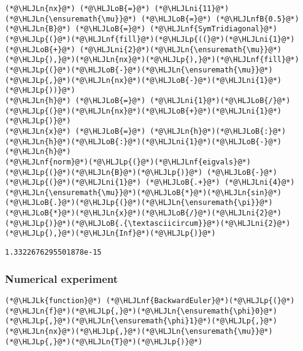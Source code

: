 \documentclass[12pt,landscape]{article}
\newcommand{\HLJLk}[1]{\textcolor[RGB]{148,91,176}{\textbf{#1}}}
\newcommand{\HLJLn}[1]{#1}
\newcommand{\HLJLnf}[1]{\textcolor[RGB]{66,102,213}{#1}}
\newcommand{\HLJLnfB}[1]{\textcolor[RGB]{59,151,46}{#1}}
\newcommand{\HLJLni}[1]{\textcolor[RGB]{59,151,46}{#1}}
\newcommand{\HLJLoB}[1]{\textcolor[RGB]{102,102,102}{\textbf{#1}}}
\newcommand{\HLJLp}[1]{#1}
\begin{document}
{\begin{lstlisting}
(*@\HLJLn{nx}@*) (*@\HLJLoB{=}@*) (*@\HLJLni{11}@*)
(*@\HLJLn{\ensuremath{\mu}}@*) (*@\HLJLoB{=}@*) (*@\HLJLnfB{0.5}@*)
(*@\HLJLn{B}@*) (*@\HLJLoB{=}@*) (*@\HLJLnf{SymTridiagonal}@*)(*@\HLJLp{(}@*)(*@\HLJLnf{fill}@*)(*@\HLJLp{((}@*)(*@\HLJLni{1}@*) (*@\HLJLoB{+}@*) (*@\HLJLni{2}@*)(*@\HLJLn{\ensuremath{\mu}}@*)(*@\HLJLp{),}@*)(*@\HLJLn{nx}@*)(*@\HLJLp{),}@*)(*@\HLJLnf{fill}@*)(*@\HLJLp{(}@*)(*@\HLJLoB{-}@*)(*@\HLJLn{\ensuremath{\mu}}@*)(*@\HLJLp{,}@*)(*@\HLJLn{nx}@*)(*@\HLJLoB{-}@*)(*@\HLJLni{1}@*)(*@\HLJLp{))}@*)
(*@\HLJLn{h}@*) (*@\HLJLoB{=}@*) (*@\HLJLni{1}@*)(*@\HLJLoB{/}@*)(*@\HLJLp{(}@*)(*@\HLJLn{nx}@*)(*@\HLJLoB{+}@*)(*@\HLJLni{1}@*)(*@\HLJLp{)}@*)
(*@\HLJLn{x}@*) (*@\HLJLoB{=}@*) (*@\HLJLn{h}@*)(*@\HLJLoB{:}@*)(*@\HLJLn{h}@*)(*@\HLJLoB{:}@*)(*@\HLJLni{1}@*)(*@\HLJLoB{-}@*)(*@\HLJLn{h}@*)
(*@\HLJLnf{norm}@*)(*@\HLJLp{(}@*)(*@\HLJLnf{eigvals}@*)(*@\HLJLp{(}@*)(*@\HLJLn{B}@*)(*@\HLJLp{)}@*) (*@\HLJLoB{-}@*) (*@\HLJLp{(}@*)(*@\HLJLni{1}@*) (*@\HLJLoB{.+}@*) (*@\HLJLni{4}@*)(*@\HLJLn{\ensuremath{\mu}}@*)(*@\HLJLoB{*}@*)(*@\HLJLn{sin}@*)(*@\HLJLoB{.}@*)(*@\HLJLp{(}@*)(*@\HLJLn{\ensuremath{\pi}}@*)(*@\HLJLoB{*}@*)(*@\HLJLn{x}@*)(*@\HLJLoB{/}@*)(*@\HLJLni{2}@*)(*@\HLJLp{)}@*)(*@\HLJLoB{.{\textasciicircum}}@*)(*@\HLJLni{2}@*)(*@\HLJLp{),}@*)(*@\HLJLn{Inf}@*)(*@\HLJLp{)}@*)
\end{lstlisting}

\begin{lstlisting}
1.3322676295501878e-15
\end{lstlisting}


\subsubsection{Numerical experiment}

\begin{lstlisting}
(*@\HLJLk{function}@*) (*@\HLJLnf{BackwardEuler}@*)(*@\HLJLp{(}@*)(*@\HLJLn{f}@*)(*@\HLJLp{,}@*)(*@\HLJLn{\ensuremath{\phi}0}@*)(*@\HLJLp{,}@*)(*@\HLJLn{\ensuremath{\phi}1}@*)(*@\HLJLp{,}@*)(*@\HLJLn{nx}@*)(*@\HLJLp{,}@*)(*@\HLJLn{\ensuremath{\mu}}@*)(*@\HLJLp{,}@*)(*@\HLJLn{T}@*)(*@\HLJLp{)}@*)
    

\end{lstlisting}}
\end{document}
